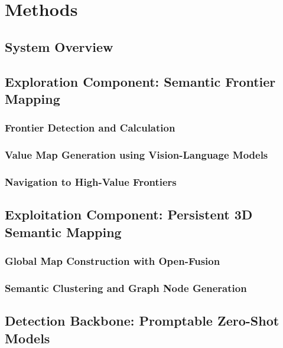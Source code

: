 \chapter{Methods}

\section{System Overview}

\section{Exploration Component: Semantic Frontier Mapping}
\subsection{Frontier Detection and Calculation}
\subsection{Value Map Generation using Vision-Language Models}
\subsection{Navigation to High-Value Frontiers}

\section{Exploitation Component: Persistent 3D Semantic Mapping}
\subsection{Global Map Construction with Open-Fusion}
\subsection{Semantic Clustering and Graph Node Generation}

\section{Detection Backbone: Promptable Zero-Shot Models}
